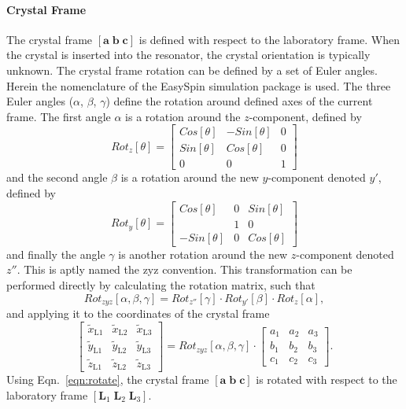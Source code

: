 \paragraph*{Crystal Frame} The crystal frame $[\mathbf{a}\; \mathbf{b}\; \mathbf{c}]$ is defined with respect to the laboratory frame. When the crystal is inserted into the resonator, the crystal orientation is typically unknown. The crystal frame rotation can be defined by a set of Euler angles. Herein the nomenclature of the EasySpin simulation package is used. \cite{STOLL200642} The three Euler angles ($\alpha$, $\beta$, $\gamma$) define the rotation around defined axes of the current frame. The first angle $\alpha$ is a rotation around the $z$-component, defined by
\begin{equation}
    Rot_z[\theta] = \begin{bmatrix}
   Cos[\theta] & -Sin[\theta] & 0\\
    Sin[\theta] & Cos[\theta] & 0\\
    0 &  0 & 1
   \end{bmatrix}
\end{equation}
and the second angle $\beta$ is a rotation around the new $y$-component denoted $y'$, defined by
\begin{equation}
    Rot_y[\theta] = \begin{bmatrix}
   Cos[\theta] & 0 & Sin[\theta]\\
     & 1 & 0\\
    -Sin[\theta] &  0 & Cos[\theta]
   \end{bmatrix}
\end{equation}
and finally the angle $\gamma$ is another rotation around the new $z$-component denoted $z''$. This is aptly named the zyz convention. This transformation can be performed directly by calculating the rotation matrix, such that
\begin{equation}
    Rot_{zyz}[\alpha, \beta, \gamma] = Rot_{z''}[\gamma] \cdot Rot_{y'}[\beta] \cdot Rot_z[\alpha],
\end{equation}
and applying it to the coordinates of the crystal frame
\begin{equation}
 \begin{bmatrix}
  \tilde{x}_\text{L1} & \tilde{x}_\text{L2} & \tilde{x}_\text{L3} \\
  \tilde{y}_\text{L1} & \tilde{y}_\text{L2} & \tilde{y}_\text{L3} \\
  \tilde{z}_\text{L1} & \tilde{z}_\text{L2} & \tilde{z}_\text{L3} 
  \end{bmatrix} = Rot_{zyz}[\alpha, \beta, \gamma] \cdot \begin{bmatrix}
  a_1 & a_2 & a_3 \\
  b_1 & b_2 & b_3 \\
  c_1 & c_2 & c_3 
  \end{bmatrix}\label{eqn:rotate}.
\end{equation}
Using Eqn.~\ref{eqn:rotate}, the crystal frame $[\mathbf{a}\; \mathbf{b}\; \mathbf{c}]$ is rotated with respect to the laboratory frame $[\mathbf{L}_1\; \mathbf{L}_2\; \mathbf{L}_3]$. 

